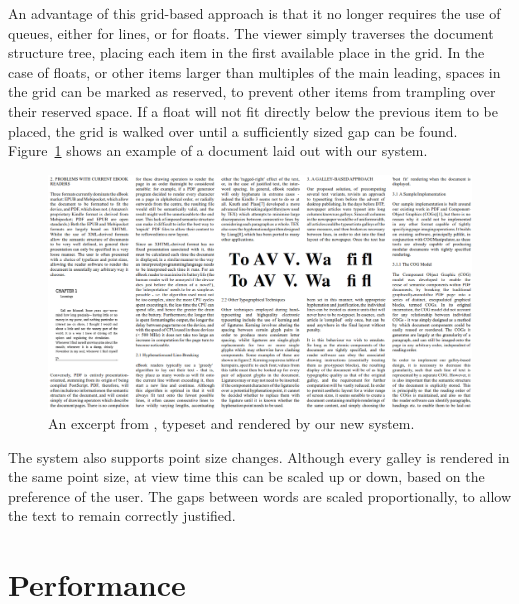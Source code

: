 An advantage of this grid-based approach is that it no longer requires the use of queues, either for lines, or for floats. The viewer simply traverses the document structure tree, placing each item in the first available place in the grid. In the case of floats, or other items larger than multiples of the main leading, spaces in the grid can be marked as reserved, to prevent other items from trampling over their reserved space. If a float will not fit directly below the previous item to be placed, the grid is walked over until a sufficiently sized gap can be found. Figure~\ref{fig:screengrab} shows an example of a document laid out with our system.


\begin{figure}
    \includegraphics[width=\textwidth]{gfx/floatrendering}
    \caption[A sample rendering with multi-column floats]{An excerpt from \cite{Pinkney2011}, typeset and rendered by our new system.}
    \label{fig:screengrab}
\end{figure}

The system also supports point size changes. Although every galley is rendered in the same point size, at view time this can be scaled up or down, based on the preference of the user. The gaps between words are scaled proportionally, to allow the text to remain correctly justified.




\section{Performance}
\label{sec:performance}

